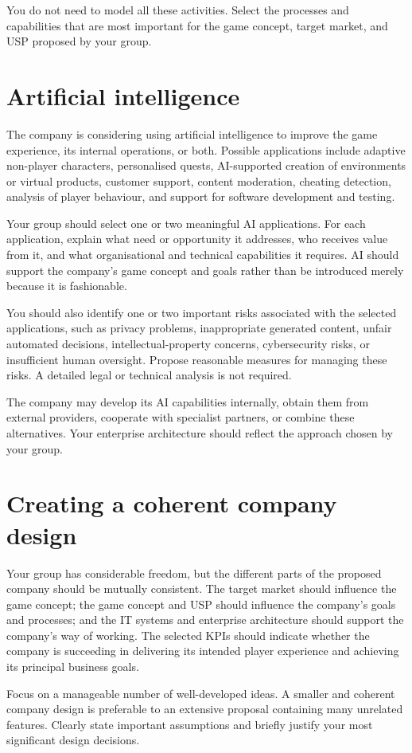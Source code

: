 \documentclass[12pt,a4paper]{article}
\begin{document}
You do not need to model all these activities. Select the processes and capabilities that are most important for the game concept,
target market, and USP proposed by your group.

\section*{Artificial intelligence}

The company is considering using artificial intelligence to improve the game experience, its internal operations, or both. Possible
applications include adaptive non-player characters, personalised quests, AI-supported creation of environments or virtual products,
customer support, content moderation, cheating detection, analysis of player behaviour, and support for software development and
testing.

Your group should select one or two meaningful AI applications. For each application, explain what need or opportunity it addresses,
who receives value from it, and what organisational and technical capabilities it requires. AI should support the company's game
concept and goals rather than be introduced merely because it is fashionable.

You should also identify one or two important risks associated with the selected applications, such as privacy problems,
inappropriate generated content, unfair automated decisions, intellectual-property concerns, cybersecurity risks, or insufficient
human oversight. Propose reasonable measures for managing these risks. A detailed legal or technical analysis is not required.

The company may develop its AI capabilities internally, obtain them from external providers, cooperate with specialist partners, or
combine these alternatives. Your enterprise architecture should reflect the approach chosen by your group.

\section*{Creating a coherent company design}

Your group has considerable freedom, but the different parts of the proposed company should be mutually consistent. The target market
should influence the game concept; the game concept and USP should influence the company's goals and processes; and the IT systems
and enterprise architecture should support the company's way of working. The selected KPIs should indicate whether the company is
succeeding in delivering its intended player experience and achieving its principal business goals.

Focus on a manageable number of well-developed ideas. A smaller and coherent company design is preferable to an extensive proposal
containing many unrelated features. Clearly state important assumptions and briefly justify your most significant design decisions.

\conclusionnobib
\end{document}
